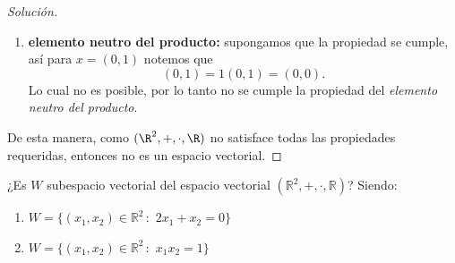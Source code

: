 \documentclass[a4,11pt]{aleph-notas}
\begin{document}
\begin{proof}[Solución]
\begin{enumerate}
\begin{align*}
                & = (\alpha \beta x_1,0)\\
                & = ((\alpha \beta) x_1,0)\\
                & = (\alpha \beta)(x_1,x_2)\\
                & = (\alpha \beta) x.
        \end{align*}
        Por lo tanto, se cumple la propiedad. 
    \item \textbf{elemento neutro del producto:} supongamos que la propiedad se cumple, así para $x=(0,1)$ notemos que 
    \[
        (0,1) = 1(0,1) = (0,0).
    \]
    Lo cual no es posible, por lo tanto no se cumple la propiedad del \emph{elemento neutro del producto}.
    \end{enumerate}
    De esta manera, como $(\R^2,+,\cdot,\R)$ no satisface todas las propiedades requeridas, entonces no es un espacio vectorial. \qedhere
    
\end{proof}

\begin{ejer}\label{ejer:12}
    ¿Es $W$ subespacio vectorial del espacio vectorial $(\mathbb{R}^2, + , \cdot, \mathbb{R})$? Siendo:
\begin{enumerate}
    \item $W = \{(x_1, x_2) \in \mathbb{R}^2 \,:\, \, 2x_1 + x_2 = 0\}$
    
    \item $W = \{(x_1, x_2) \in \mathbb{R}^2 \,:\, \, x_1x_2 = 1\}$
\end{enumerate}
\end{ejer}
\end{document}
